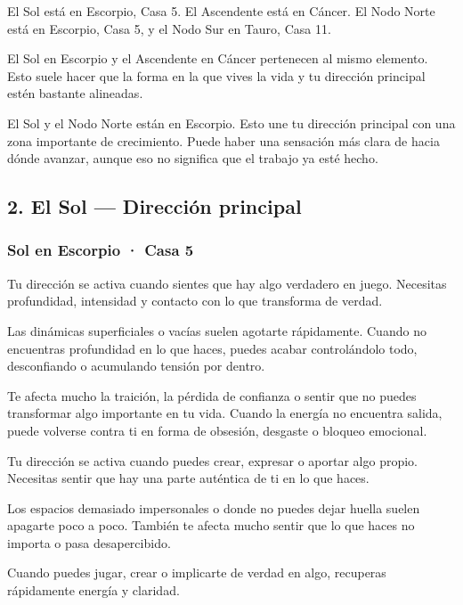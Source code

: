 \documentclass[11pt,a4paper]{article}
\begin{document}
El Sol está en Escorpio, Casa 5. El Ascendente está en Cáncer. El Nodo Norte está en Escorpio, Casa 5, y el Nodo Sur en Tauro, Casa 11.

El Sol en Escorpio y el Ascendente en Cáncer pertenecen al mismo elemento. Esto suele hacer que la forma en la que vives la vida y tu dirección principal estén bastante alineadas.

El Sol y el Nodo Norte están en Escorpio. Esto une tu dirección principal con una zona importante de crecimiento. Puede haber una sensación más clara de hacia dónde avanzar, aunque eso no significa que el trabajo ya esté hecho.

\vspace{0.5cm}


\subsection{2. El Sol — Dirección principal}

\subsubsection*{Sol en Escorpio · Casa 5}

Tu dirección se activa cuando sientes que hay algo verdadero en juego. Necesitas profundidad, intensidad y contacto con lo que transforma de verdad.

Las dinámicas superficiales o vacías suelen agotarte rápidamente. Cuando no encuentras profundidad en lo que haces, puedes acabar controlándolo todo, desconfiando o acumulando tensión por dentro.

Te afecta mucho la traición, la pérdida de confianza o sentir que no puedes transformar algo importante en tu vida. Cuando la energía no encuentra salida, puede volverse contra ti en forma de obsesión, desgaste o bloqueo emocional.

Tu dirección se activa cuando puedes crear, expresar o aportar algo propio. Necesitas sentir que hay una parte auténtica de ti en lo que haces.

Los espacios demasiado impersonales o donde no puedes dejar huella suelen apagarte poco a poco. También te afecta mucho sentir que lo que haces no importa o pasa desapercibido.

Cuando puedes jugar, crear o implicarte de verdad en algo, recuperas rápidamente energía y claridad.
\end{document}
